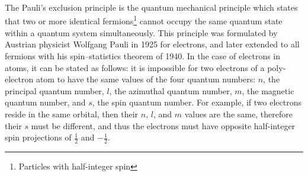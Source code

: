 \begin{phybox}{}
{The Pauli's exclusion principle is the quantum mechanical principle which states that two or more identical fermions\footnote{Particles with half-integer spin} cannot occupy the same quantum state within a quantum system simultaneously. This principle was formulated by Austrian physicist Wolfgang Pauli in 1925 for electrons, and later extended to all fermions with his spin–statistics theorem of 1940.
In the case of electrons in atoms, it can be stated as follows: it is impossible for two electrons of a poly-electron atom to have the same values of the four quantum numbers: $n$, the principal quantum number, $l$, the azimuthal quantum number, $m$, the magnetic quantum number, and $s$, the spin quantum number. For example, if two electrons reside in the same orbital, then their $n$, $l$, and $m$ values are the same, therefore their $s$ must be different, and thus the electrons must have opposite half-integer spin projections of $\frac{1}{2}$ and $-\frac{1}{2}$.}
\end{phybox}
